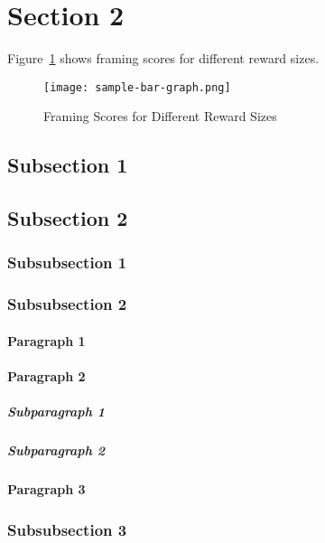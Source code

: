 \section{Section 2}
Figure~\ref{fig:sample-bar-graph} shows framing scores for different reward sizes.

\begin{figure}
  \centering
  \texttt{[image: sample-bar-graph.png]}
  \caption{Framing Scores for Different Reward Sizes}\label{fig:sample-bar-graph}
\end{figure}

\subsection{Subsection 1}

\subsection{Subsection 2}

\subsubsection{Subsubsection 1}

\subsubsection{Subsubsection 2}

\paragraph{Paragraph 1}

\paragraph{Paragraph 2}

\subparagraph{Subparagraph 1}

\subparagraph{Subparagraph 2}

\paragraph{Paragraph 3}

\subsubsection{Subsubsection 3}

